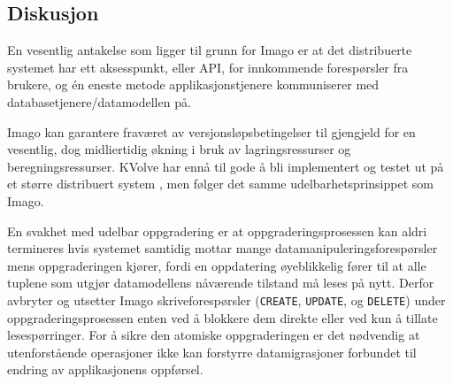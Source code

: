 \subsection{Diskusjon}
En vesentlig antakelse som ligger til grunn for Imago er at det distribuerte systemet har ett aksesspunkt, eller API, for innkommende forespørsler fra brukere, og én eneste metode applikasjonstjenere kommuniserer med databasetjenere/datamodellen på.

Imago kan garantere fraværet av versjonsløpsbetingelser til gjengjeld for en vesentlig, dog midliertidig økning i bruk av lagringsressurser og beregningsressurser. KVolve har ennå til gode å bli implementert og testet ut på et større distribuert system \citep{saur2016}, men følger det samme udelbarhetsprinsippet som Imago.

En svakhet med udelbar oppgradering er at oppgraderingsprosessen kan aldri termineres hvis systemet samtidig mottar mange datamanipuleringsforespørsler mens oppgraderingen kjører, fordi en oppdatering øyeblikkelig fører til at alle tuplene som utgjør datamodellens nåværende tilstand må leses på nytt. Derfor avbryter og utsetter Imago skriveforespørsler (\texttt{CREATE}, \texttt{UPDATE}, og \texttt{DELETE}) under oppgraderingsprosessen enten ved å blokkere dem direkte eller ved kun å tillate lesespørringer. For å sikre den atomiske oppgraderingen er det nødvendig at utenforstående operasjoner ikke kan forstyrre datamigrasjoner forbundet til endring av applikasjonens oppførsel.


